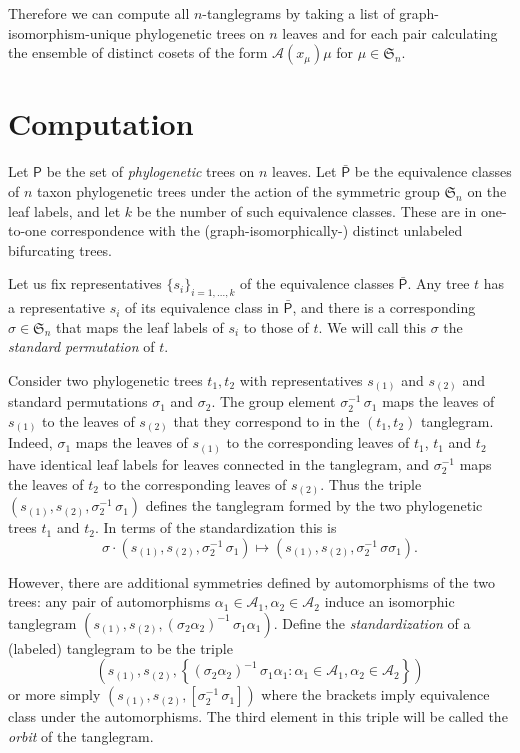 \documentclass{amsart}
\newcommand{\fS}{\mathfrak S}
\newcommand{\aut}{\mathcal A}
\newcommand{\pairing}{\mu}
\newcommand{\ptree}{\mathsf{P}}
\newcommand{\ptequiv}{\bar{\ptree}}  %
\begin{document}
Therefore we can compute all $n$-tanglegrams by taking a list of graph-isomorphism-unique phylogenetic trees on $n$ leaves and for each pair calculating the ensemble of distinct cosets of the form $\aut(x_\pairing) \pairing$ for $\pairing \in \fS_n$.



\section{Computation}
Let $\ptree$ be the set of \emph{phylogenetic} trees on $n$ leaves.
Let $\ptequiv$ be the equivalence classes of $n$ taxon phylogenetic trees under the action of the symmetric group $\fS_n$ on the leaf labels, and let $k$ be the number of such equivalence classes.
These are in one-to-one correspondence with the (graph-isomorphically-) distinct unlabeled bifurcating trees.

Let us fix representatives $\{s_i\}_{i=1,\ldots,k}$ of the equivalence classes $\ptequiv$.
Any tree $t$ has a representative $s_i$ of its equivalence class in $\ptequiv$, and there is a corresponding $\sigma \in \fS_n$ that maps the leaf labels of $s_i$ to those of $t$.
We will call this $\sigma$ the \emph{standard permutation} of $t$.

Consider two phylogenetic trees $t_1, t_2$ with representatives $s_{(1)}$ and $s_{(2)}$ and standard permutations $\sigma_1$ and $\sigma_2$.
The group element $\sigma_2^{-1} \, \sigma_1$ maps the leaves of $s_{(1)}$ to the leaves of $s_{(2)}$ that they correspond to in the $(t_1, t_2)$ tanglegram.
Indeed, $\sigma_1$ maps the leaves of $s_{(1)}$ to the corresponding leaves of $t_1$, $t_1$ and $t_2$ have identical leaf labels for leaves connected in the tanglegram, and $\sigma_2^{-1}$ maps the leaves of $t_2$ to the corresponding leaves of $s_{(2)}$.
Thus the triple $(s_{(1)}, s_{(2)}, \sigma_2^{-1} \, \sigma_1)$ defines the tanglegram formed by the two phylogenetic trees $t_1$ and $t_2$.
In terms of the standardization this is
\[
\sigma \cdot (s_{(1)}, s_{(2)}, \sigma_2^{-1} \, \sigma_1) \mapsto (s_{(1)}, s_{(2)}, \sigma_2^{-1} \, \sigma \sigma_1).
\]



However, there are additional symmetries defined by automorphisms of the two trees: any pair of automorphisms $\alpha_1 \in \aut_1, \alpha_2 \in \aut_2$ induce an isomorphic tanglegram $(s_{(1)}, s_{(2)}, \left(\sigma_2 \alpha_2 \right)^{-1} \, \sigma_1 \alpha_1)$.
Define the \emph{standardization} of a (labeled) tanglegram to be the triple
\begin{equation}
\label{eq:orbit}
\left(s_{(1)}, s_{(2)}, \left\{(\sigma_2 \alpha_2)^{-1} \, \sigma_1 \alpha_1 : \alpha_1 \in \aut_1, \alpha_2 \in \aut_2  \right\}\right)
\end{equation}
or more simply $(s_{(1)}, s_{(2)}, [\sigma_2^{-1} \, \sigma_1])$ where the brackets imply equivalence class under the automorphisms.
The third element in this triple will be called the \emph{orbit} of the tanglegram.
\end{document}
